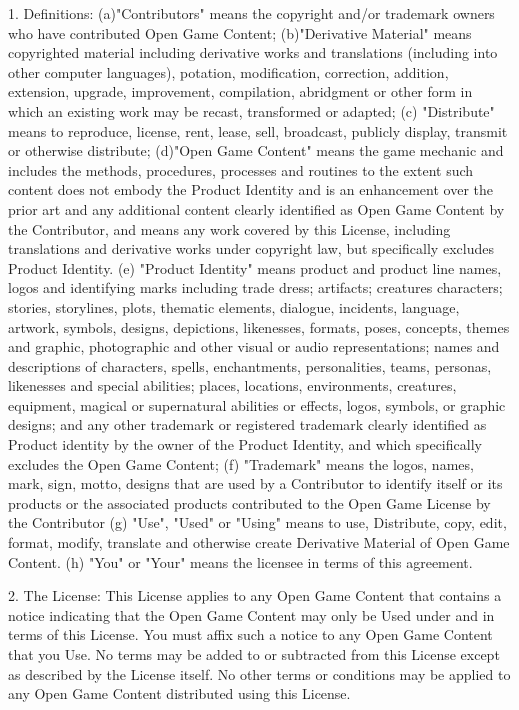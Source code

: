 \documentclass[a4paper, twocolumn, 10pt]{book}
\begin{document}
1. Definitions: (a)"Contributors" means the copyright and/or trademark owners who have contributed Open Game Content; (b)"Derivative Material" means copyrighted material including derivative works and translations (including into other computer languages), potation, modification, correction, addition, extension, upgrade, improvement, compilation, abridgment or other form in which an existing work may be recast, transformed or adapted; (c) "Distribute" means to reproduce, license, rent, lease, sell, broadcast, publicly display, transmit or otherwise distribute; (d)"Open Game Content" means the game mechanic and includes the methods, procedures, processes and routines to the extent such content does not embody the Product Identity and is an enhancement over the prior art and any additional content clearly identified as Open Game Content by the Contributor, and means any work covered by this License, including translations and derivative works under copyright law, but specifically excludes Product Identity. (e) "Product Identity" means product and product line names, logos and identifying marks including trade dress; artifacts; creatures characters; stories, storylines, plots, thematic elements, dialogue, incidents, language, artwork, symbols, designs, depictions, likenesses, formats, poses, concepts, themes and graphic, photographic and other visual or audio representations; names and descriptions of characters, spells, enchantments, personalities, teams, personas, likenesses and special abilities; places, locations, environments, creatures, equipment, magical or supernatural abilities or effects, logos, symbols, or graphic designs; and any other trademark or registered trademark clearly identified as Product identity by the owner of the Product Identity, and which specifically excludes the Open Game Content; (f) "Trademark" means the logos, names, mark, sign, motto, designs that are used by a Contributor to identify itself or its products or the associated products contributed to the Open Game License by the Contributor (g) "Use", "Used" or "Using" means to use, Distribute, copy, edit, format, modify, translate and otherwise create Derivative Material of Open Game Content. (h) "You" or "Your" means the licensee in terms of this agreement.

2. The License: This License applies to any Open Game Content that contains a notice indicating that the Open Game Content may only be Used under and in terms of this License. You must affix such a notice to any Open Game Content that you Use. No terms may be added to or subtracted from this License except as described by the License itself. No other terms or conditions may be applied to any Open Game Content distributed using this License.
\end{document}
